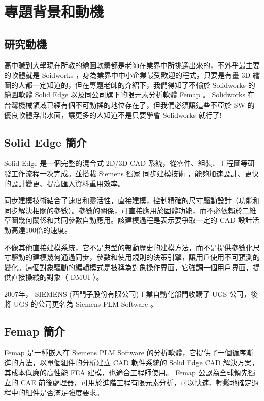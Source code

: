 \chapter{專題背景和動機}
\renewcommand{\baselinestretch}{10.0} %
\setcounter{page}{1}  %
\fontsize{14pt}{2.5pt}\sectionef
\begin{section}
\section{研究動機}

高中職到大學現在所教的繪圖軟體都是老師在業界中所挑選出來的，不外乎最主要的軟體就是 Soidworks ，身為業界中中小企業最受歡迎的程式，只要是有畫 3D 繪圖的人都一定知道的，但在專題老師的介紹下，我們得知了不輸於 Solidworks 的繪圖軟體 Solid Edge 以及同公司旗下的限元素分析軟體 Femap 。 Solidworks 在台灣機械領域已經有個不可動搖的地位存在了，但我們必須讓這些不亞於 SW 的優良軟體浮出水面，讓更多的人知道不是只要學會 Solidworks 就行了!\\
\end{section}

\begin{section}
\section{ Solid Edge 簡介}
 Solid Edge 是一個完整的混合式 2D/3D CAD 系統，從零件、組裝、工程圖等研發工作流程一次完成。並搭載 Siemens 獨家 同步建模技術 ，能夠加速設計、更快的設計變更、提高匯入資料重用效率。

同步建模技術結合了速度和靈活性，直接建模，控制精確的尺寸驅動設計（功能和同步解決相關的參數）。參數的關係，可直接應用於固體功能，而不必依賴於二維草圖幾何關係和共同參數自動應用。該建模過程是表示要爭取一定的 CAD 設計活動高達100倍的速度。

不像其他直接建模系統，它不是典型的帶動歷史的建模方法，而不是提供參數化尺寸驅動的建模幾何通過同步，參數和使用規則的決策引擎，讓用戶使用不可預測的變化。這個對象驅動的編輯模式是被稱為對象操作界面，它強調一個用戶界面，提供直接操縱的對象（ DMUI ）。

2007年， SIEMENS (西門子股份有限公司)工業自動化部門收購了 UGS 公司，後將 UGS 的公司更名為 Siemens PLM Software 。 \\
\end{section}

\begin{section}
\section{ Femap 簡介}
 Femap 是一種嵌入在 Siemens PLM Software 的分析軟體，它提供了一個循序漸進的方法，以單個組件的分析建立 CAD 軟件系統的 Solid Edge CAD 解決方案，其成本低廉的高性能 FEA 建模，也適合工程師使用。 Femap 公認為全球領先獨立的 CAE 前後處理器，可用於進階工程有限元素分析，可以快速、輕鬆地確定過程中的組件是否滿足強度要求。 \\
\end{section}
 


\renewcommand{\baselinestretch}{0.5} %
